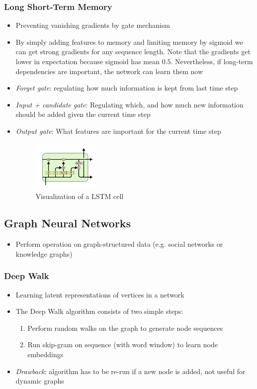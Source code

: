 \subsubsection{Long Short-Term Memory}
\begin{itemize}
	\item Preventing vanishing gradients by gate mechanism
	\item By simply adding features to memory and limiting memory by sigmoid we can get strong gradients for any sequence length. Note that the gradients get lower in expectation because sigmoid has mean $0.5$. Nevertheless, if long-term dependencies are important, the network can learn them now
	\item \textit{Forget gate}: regulating how much information is kept from last time step
	\item \textit{Input + candidate gate}: Regulating which, and how much new information should be added given the current time step
	\item \textit{Output gate}: What features are important for the current time step
	\begin{figure}[ht!]
		\centering
		\includegraphics[width=0.3\textwidth]{figures/RNN_LSTM.png}
		\caption{Visualization of a LSTM cell}
		\label{fig:RNN_LSTM}
	\end{figure}
\end{itemize}
\subsection{Graph Neural Networks}
\begin{itemize}
	\item Perform operation on graph-structured data (e.g. social networks or knowledge graphs)
\end{itemize}
\subsubsection{Deep Walk}
\begin{itemize}
	\item Learning latent representations of vertices in a network
	\item The Deep Walk algorithm consists of two simple steps:
	\begin{enumerate}
		\item Perform random walks on the graph to generate node sequences
		\item Run skip-gram on sequence (with word window) to learn node embeddings
	\end{enumerate}
	\item \textit{Drawback}: algorithm has to be re-run if a new node is added, not useful for dynamic graphs
\end{itemize}
